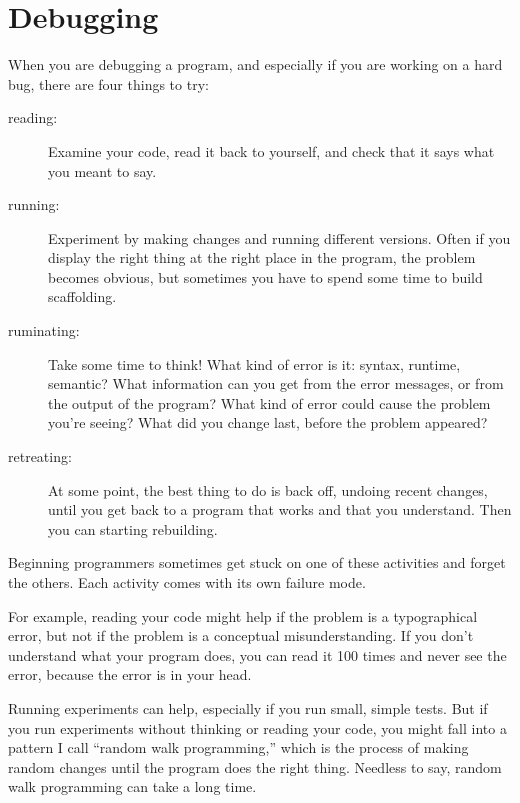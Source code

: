 \documentclass[10pt]{book}
\begin{document}
\section{Debugging}

When you are debugging a program, and especially if you are
working on a hard bug, there are four things to try:

\begin{description}

\item[reading:] Examine your code, read it back to yourself, and
check that it says what you meant to say.

\item[running:] Experiment by making changes and running different
versions.  Often if you display the right thing at the right place
in the program, the problem becomes obvious, but sometimes you have to
spend some time to build scaffolding.

\item[ruminating:] Take some time to think!  What kind of error
is it: syntax, runtime, semantic?  What information can you get from
the error messages, or from the output of the program?  What kind of
error could cause the problem you're seeing?  What did you change
last, before the problem appeared?

\item[retreating:] At some point, the best thing to do is back
off, undoing recent changes, until you get back to a program that
works and that you understand.  Then you can starting rebuilding.

\end{description}

Beginning programmers sometimes get stuck on one of these activities
and forget the others.  Each activity comes with its own failure
mode.


For example, reading your code might help if the problem is a
typographical error, but not if the problem is a conceptual
misunderstanding.  If you don't understand what your program does, you
can read it 100 times and never see the error, because the error is in
your head.


Running experiments can help, especially if you run small, simple
tests.  But if you run experiments without thinking or reading your
code, you might fall into a pattern I call ``random walk programming,''
which is the process of making random changes until the program
does the right thing.  Needless to say, random walk programming
can take a long time.
\end{document}
